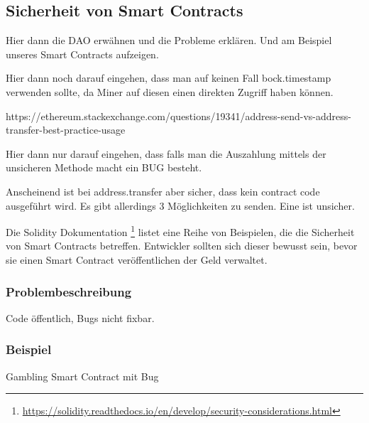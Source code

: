 \subsection{Sicherheit von Smart Contracts}
Hier dann die DAO erwähnen und die Probleme erklären. Und am Beispiel unseres Smart Contracts aufzeigen. 

Hier dann noch darauf eingehen, dass man auf keinen Fall bock.timestamp verwenden sollte, da Miner auf diesen einen direkten Zugriff haben können.

https://ethereum.stackexchange.com/questions/19341/address-send-vs-address-transfer-best-practice-usage

Hier dann nur darauf eingehen, dass falls man die Auszahlung mittels der unsicheren Methode macht ein BUG besteht. 

Anscheinend ist bei address.transfer aber sicher, dass kein contract code ausgeführt wird. Es gibt allerdings 3 Möglichkeiten zu senden.
Eine ist unsicher.



Die Solidity Dokumentation \footnote{\url{https://solidity.readthedocs.io/en/develop/security-considerations.html}} listet eine Reihe von Beispielen, die die Sicherheit von Smart Contracts betreffen. Entwickler sollten sich dieser bewusst sein, bevor sie einen Smart Contract veröffentlichen der Geld verwaltet.

\subsubsection{Problembeschreibung}
Code öffentlich, Bugs nicht fixbar.
\subsubsection{Beispiel}
Gambling Smart Contract mit Bug